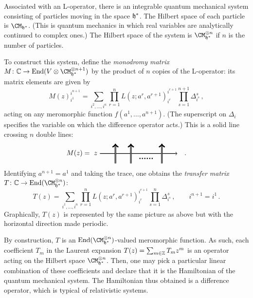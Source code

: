 Associated with an L-operator, there is an integrable quantum
mechanical system consisting of particles moving in the space $\mathfrak{h}^*$.
The Hilbert space of each particle is $\CM_{\hf^*}$.  (This is quantum
mechanics in which real variables are analytically continued to
complex ones.) The Hilbert space of the system is
$\CM_{\hf^*}^{\otimes n}$ if $n$ is the number of particles.

To construct this system, define the \emph{monodromy matrix}
$M\colon \C \to \End(V \otimes \CM_{\hf^*}^{\otimes n + 1})$ by the
product of $n$ copies of the L-operator: its matrix elements are given
by
\begin{equation}
  M(z)^{i^{n+1}}_{i^1}
  =
  \sum_{i^2, \dotsc, i^n}
  \prod_{r=1}^n
  L(z; a^r,a^{r+1})^{i^{r+1}}_{i^r}
  \prod_{s=1}^{n+1} \Delta_{i^s}^s \,,
\end{equation}
acting on any meromorphic function $f(a^1, \dotsc, a^{n+1})$.  (The
superscript on $\Delta_i$ specifies the variable on which the
difference operator acts.)  This is a solid line crossing $n$ double
lines:
\begin{equation}
  M(z)
  =
  \begin{tikzpicture}[xscale=0.8, yscale=0.5, baseline=(x.base)]
    \node (x) at (0,0) {\vphantom{x}};

    \draw[thick, ->] (0,0) node[left] {$z$} -- (5,0);
    \draw[thick, double, ->] (1,-1) -- +(90:2);
    \draw[thick, double, ->] (2,-1) -- +(90:2);

    \draw[ultra thick, dotted, -] (2.55,-0.5) -- (3.45,-0.5);

    \draw[thick, double, ->] (4,-1) -- +(90:2);
  \end{tikzpicture}
  \quad .
\end{equation}
Identifying $a^{n+1} = a^1$ and taking the trace, one
obtains the \emph{transfer matrix}
$T\colon \C \to \End(\CM_{\hf^*}^{\otimes n})$:
\begin{equation}
  T(z)
  =
  \sum_{i^1, \dotsc, i^n}
  \prod_{r=1}^n
  L(z; a^r,a^{r+1})^{i^{r+1}}_{i^r}
  \prod_{s=1}^n \Delta_{i^s}^s
  \,,
  \qquad
  i^{n+1} = i^1 \,.
\end{equation}
Graphically, $T(z)$ is represented by the same picture as above but
with the horizontal direction made periodic.

By construction, $T$ is an $\End(\CM_{\hf^*}^{\otimes n})$-valued
meromorphic function.  As such, each coefficient $T_m$ in the Laurent
expansion $T(z) = \sum_{m \in \mathbb{Z}} T_m z^m$ is an operator acting on
the Hilbert space $\CM_{\hf^*}^{\otimes n}$.  Then, one may pick a
particular linear combination of these coefficients and declare that
it is the Hamiltonian of the quantum mechanical system.  The
Hamiltonian thus obtained is a difference operator, which is typical
of relativistic systems.

